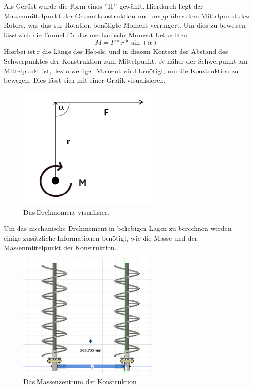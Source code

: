 Als Gerüst wurde die Form eines $"$H$"$ gewählt. Hierdurch liegt der Massenmittelpunkt der Gesamtkonstruktion nur knapp über dem Mittelpunkt des Rotors, was das zur Rotation benötigte Moment verringert. Um dies zu beweisen lässt sich die Formel für das mechanische Moment betrachten.
\begin{equation}
	M=F*r*\sin(\alpha)
	\label{form:drehmoment}
\end{equation}
Hierbei ist r die Länge des Hebels, und in diesem Kontext der Abstand des Schwerpunktes der Konstruktion zum Mittelpunkt. Je näher der Schwerpunkt am Mittelpunkt ist, desto weniger Moment wird benötigt, um die Konstruktion zu bewegen. Dies lässt sich mit einer Grafik visualisieren.

\begin{figure}[h!]
	\centering
	\includegraphics[width=7cm]{../ref/Drehmoment.png}
	\caption{Das Drehmoment visualisiert}
	\label{fig:mechanische-moment}
\end{figure}

Um das mechanische Drehmoment in beliebigen Lagen zu berechnen werden einige zusätzliche Informationen benötigt, wie die Masse und der Massenmittelpunkt der Konstruktion.

\begin{figure}[h!]
	\centering
	\includegraphics[width=7cm]{../ref/Massenmittelpunkt.png}
	\caption{Das Massenzentrum der Konstruktion}
	\label{fig:massenmittelpunkt}
\end{figure}

